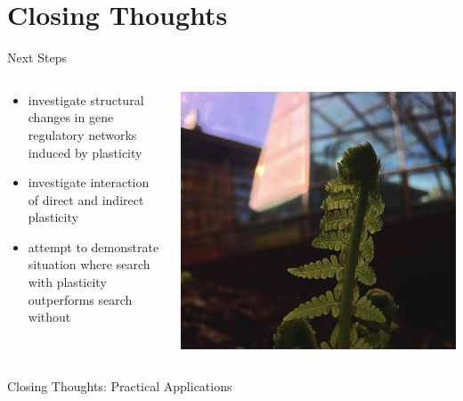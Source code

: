 \section{Closing Thoughts}

\begin{frame}{Next Steps}
\begin{columns}
\begin{column}{0.6\textwidth}
\begin{itemize}
\item investigate structural changes in gene regulatory networks induced by plasticity
\item investigate interaction of direct and indirect plasticity
\item attempt to demonstrate situation where search with plasticity outperforms search without
\end{itemize}
\end{column}
\begin{column}{0.4\textwidth}
\begin{center}
\includegraphics[width=\textwidth,trim={7cm 0 8cm 0},clip]{img/oppfern}
\end{center}
\end{column}
\end{columns}
\end{frame}

\begin{frame}{Closing Thoughts: Practical Applications}

\end{frame}

